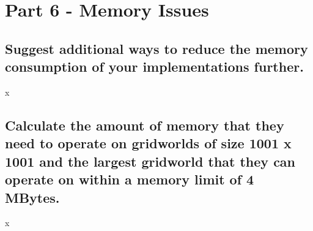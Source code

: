 \documentclass{article}
\begin{document}
\section{Part 6 - Memory Issues}

\subsection{Suggest additional ways to reduce the memory consumption of your implementations further.}
x
\subsection{Calculate the amount of memory that they need to operate on gridworlds of size 1001 x 1001 and the largest gridworld that they can operate on within a memory limit of 4 MBytes.}
x
\end{document}
